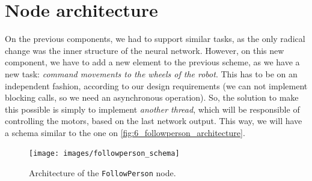 \section{Node architecture}
	On the previous components, we had to support similar tasks, as the only radical change was the inner structure of the neural network. However, on this new component, we have to add a new element to the previous scheme, as we have a new task: \emph{command movements to the wheels of the robot}. This has to be on an independent fashion, according to our design requirements (we can not implement blocking calls, so we need an asynchronous operation). So, the solution to make this possible is simply to implement \emph{another thread}, which will be responsible of controlling the motors, based on the last network output. This way, we will have a schema similar to the one on \autoref{fig:6_followperson_architecture}.
	
	\begin{figure}[h]
		\centering
		\texttt{[image: images/followperson\_schema]}
		\caption{Architecture of the \texttt{FollowPerson} node.}
		\label{fig:6_followperson_architecture}
	\end{figure}
	
